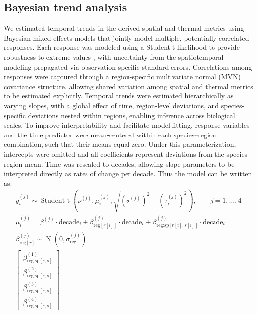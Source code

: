 \documentclass[9pt,twocolumn,twoside]{pnas-new}
\begin{document}
{\subsection*{Bayesian trend analysis}\label{sec:Bayesian trend analysis}

We estimated temporal trends in the derived spatial and thermal metrics using Bayesian mixed-effects models that jointly model multiple, potentially correlated responses. Each response was modeled using a Student-t likelihood to provide robustness to extreme values \citep[e.g.,][]{anderson_black-swan_2017}, with uncertainty from the spatiotemporal modeling propagated via observation-specific standard errors. Correlations among responses were captured through a region-specific multivariate normal (MVN) covariance structure, allowing shared variation among spatial and thermal metrics to be estimated explicitly. Temporal trends were estimated hierarchically as varying slopes, with a global effect of time, region-level deviations, and species-specific deviations nested within regions, enabling inference across biological scales. To improve interpretability and facilitate model fitting, response variables and the time predictor were mean-centered within each species–region combination, such that their means equal zero. Under this parameterization, intercepts were omitted and all coefficients represent deviations from the species–region mean. Time was rescaled to decades, allowing slope parameters to be interpreted directly as rates of change per decade.
Thus the model can be written as:
\begin{gather}
y_{i}^{(j)} \sim \operatorname{Student\text{-}t}
\left(\nu^{(j)}, 
\mu_{i}^{(j)}, 
\sqrt{(\sigma^{(j)})^{2} + (\tau^{(j)}_{i})^{2}}
\right),
\qquad j=1,\dots,4 \label{eq:likelihood}
\\
\mu_{i}^{(j)} =
\beta^{(j)} \cdot \text{decade}_{i}
+ \beta_{\text{reg}[r[i]]}^{(j)} \cdot \text{decade}_{i}
+ \beta_{\text{reg:sp}[r[i],s[i]]}^{(j)} \cdot \text{decade}_{i} \label{eq:linearpred}
\\
\beta_{\text{reg}[r]}^{(j)} \sim 
\operatorname{N}\!\left(0,\sigma_{\text{reg}}^{(j)}\right) \label{eq:regionslope}
\\
\begin{bmatrix}
\beta_{\text{reg:sp}[r,s]}^{(1)} \\
\beta_{\text{reg:sp}[r,s]}^{(2)} \\
\beta_{\text{reg:sp}[r,s]}^{(3)} \\
\beta_{\text{reg:sp}[r,s]}^{(4)}
\end{bmatrix}

\end{gather}}
\end{document}
